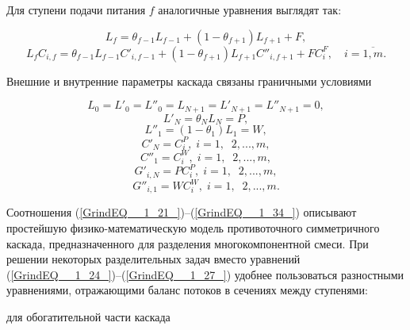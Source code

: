 Для ступени подачи питания $f$ аналогичные уравнения выглядят так:

\begin{equation} \label{GrindEQ__1_26_} 
  L_{f} =\theta _{f-1} L_{f-1} +(1-\theta _{f+1} )L_{f+1} +F, 
  \end{equation} 
  \begin{equation} \label{GrindEQ__1_27_} 
  L_{f} C_{i,f} =\theta _{f-1} L_{f-1} C'_{i,f-1} +(1-\theta _{f+1} )L_{f+1} C''_{i,f+1} +FC_{i}^{F} ,\quad i=\overline{1,m}.            
\end{equation}

Внешние и внутренние параметры каскада связаны граничными условиями

\begin{equation} \label{GrindEQ__1_28_} 
  L_{0} =L'_{0} =L''_{0} =L_{N+1} =L'_{N+1} =L''_{N+1} =0, 
  \end{equation} 
  \begin{equation} \label{GrindEQ__1_29_} 
  L'_{N} =\theta _{N} L_{N} =P,        
  \end{equation} 
  \begin{equation} \label{GrindEQ__1_30_} 
  L''_{1} =(1-\theta _{1} )L_{1} =W,        
  \end{equation} 
  \begin{equation} \label{GrindEQ__1_31_} 
  C'_{N} =C_{i}^{P} ,\; i=1,\; \; 2,...,m, 
  \end{equation} 
  \begin{equation} \label{GrindEQ__1_32_} 
  C''_{1} =C_{i}^{W} ,\; i=1,\; \; 2,...,m, 
  \end{equation} 
  \begin{equation} \label{GrindEQ__1_33_} 
  G'_{i,N} =PC_{i}^{P} ,\; i=1,\; \; 2,...,m, 
  \end{equation} 
  \begin{equation} \label{GrindEQ__1_34_} 
  G''_{i,1} =WC_{i}^{W} ,\; i=1,\; \; 2,...,m. 
\end{equation} 

Соотношения (\ref{GrindEQ__1_21_})--(\ref{GrindEQ__1_34_}) описывают простейшую физико-математическую модель противоточного симметричного каскада, предназначенного для разделения многокомпонентной смеси. При решении некоторых разделительных задач вместо уравнений (\ref{GrindEQ__1_24_})--(\ref{GrindEQ__1_27_}) удобнее пользоваться разностными уравнениями, отражающими баланс потоков в сечениях между ступенями:

для обогатительной части каскада

